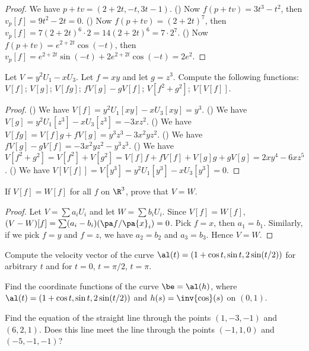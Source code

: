 \begin{proof}
    We have $p+tv=(2+2t,-t,3t-1)$. () Now $f(p+tv)=3{t}^{3}-{t}^{2}$, then ${v}_{p}[f]=9{t}^{2}-2t=0$. () Now $f(p+tv)={(2+2t)}^{7}$, then ${v}_{p}[f]=7{(2+2t)}^{6}\cdot 2=14{(2+2t)}^{6}=7\cdot{2}^{7}$. () Now $f(p+tv)={e}^{2+2t}\cos(-t)$, then ${v}_{p}[f]={e}^{2+2t}\sin(-t)+2{e}^{2+2t}\cos(-t)=2{e}^{2}$.
\end{proof}
\begin{exercise}[1.3.3]
    Let $V={y}^{2}{U}_{1}-x{U}_{3}$. Let $f=xy$ and let $g={z}^{3}$. Compute the following functions: $V[f]$; $V[g]$; $V[fg]$; $fV[g]-gV[f]$; $V[{f}^{2}+{g}^{2}]$; $V[V[f]]$.
\end{exercise}
\begin{proof}
    () We have $V[f]={y}^{2}{U}_{1}[xy]-x{U}_{3}[xy]={y}^{3}$. () We have $V[g]={y}^{2}{U}_{1}[{z}^{3}]-x{U}_{3}[{z}^{3}]=-3x{z}^{2}$. () We have $V[fg]=V[f]g+fV[g]={y}^{3}{z}^{3}-3{x}^{2}y{z}^{2}$. () We have $fV[g]-gV[f]=-3{x}^{2}y{z}^{2}-{y}^{3}{z}^{3}$. () We have $V[{f}^{2}+{g}^{2}]=V[{f}^{2}]+V[{g}^{2}]=V[f]f+fV[f]+V[g]g+gV[g]=2x{y}^{4}-6x{z}^{5}$. () We have $V[V[f]]=V[{y}^{3}]={y}^{2}{U}_{1}[{y}^{3}]-x{U}_{3}[{y}^{3}]=0$.
\end{proof}
\begin{exercise}[1.3.5]
    If $V[f]=W[f]$ for all $f$ on ${\R}^{3}$, prove that $V=W$.
\end{exercise}
\begin{proof}
    Let $V=\sum{a}_{i}{U}_{i}$ and let $W=\sum{b}_{i}{U}_{i}$. Since $V[f]=W[f]$, $(V-W)[f]=\sum({a}_{i}-{b}_{i})(\pa f/\pa{x}_{i})=0$. Pick $f=x$, then ${a}_{1}={b}_{1}$. Similarly, if we pick $f=y$ and $f=z$, we have ${a}_{2}={b}_{2}$ and ${a}_{3}={b}_{3}$. Hence $V=W$.
\end{proof}

\begin{exercise}[1.4.1]
    Compute the velocity vector of the curve $\al(t)=(1+\cos t,\sin t,2\sin(t/2))$ for arbitrary $t$ and for $t=0$, $t=\pi/2$, $t=\pi$. 
\end{exercise}

\begin{exercise}[1.4.3]
    Find the coordinate functions of the curve $\be=\al(h)$, where $\al(t)=(1+\cos t,\sin t,2\sin(t/2))$ and $h(s)=\inv{\cos}(s)$ on $(0,1)$.
\end{exercise}

\begin{exercise}[1.4.5]
    Find the equation of the straight line through the points $(1,-3,-1)$ and $(6,2,1)$. Does this line meet the line through the points $(-1,1,0)$ and $(-5,-1,-1)$?
\end{exercise}

